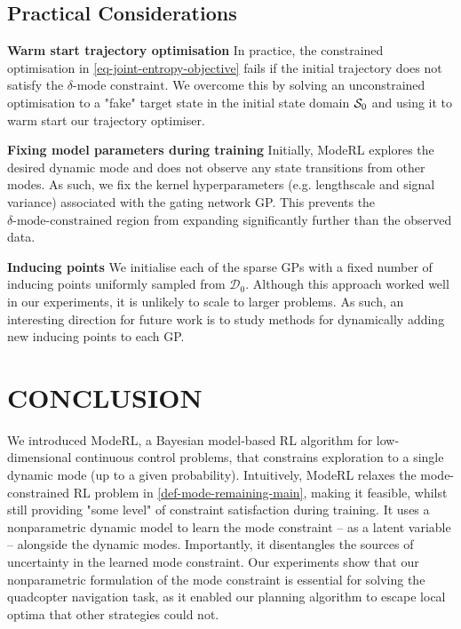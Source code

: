\documentclass[twoside]{article}
\newcommand{\dataset}{\ensuremath{\mathcal{D}}}
\begin{document}
\subsection{Practical Considerations}
\label{sec:org625c4ee}

\textbf{Warm start trajectory optimisation}
In practice, the constrained optimisation in \cref{eq-joint-entropy-objective} fails if the initial trajectory does not satisfy the \(\delta\text{-mode constraint}\).
We overcome this by solving an unconstrained optimisation to a "fake" target state in the initial
state domain \(\mathcal{S}_{0}\) and using it to warm start our trajectory optimiser.

\textbf{Fixing model parameters during training}
Initially, ModeRL explores the desired dynamic mode and does not observe any state transitions from other modes.
As such, we fix the kernel hyperparameters (e.g. lengthscale and signal variance) associated with the gating network GP.
This prevents the \(\delta\text{-mode-constrained}\) region from expanding significantly further than the observed data.

\textbf{Inducing points}
We initialise each of the sparse GPs with a fixed number of inducing points uniformly sampled from \(\dataset_{0}\).
Although this approach worked well in our experiments, it is unlikely to scale to larger problems.
As such, an interesting direction for future work is to study methods for dynamically adding new inducing points to each GP.

\section{CONCLUSION \label{sec-conclusion}}
\label{sec:orgca252bd}
We introduced ModeRL, a Bayesian model-based RL algorithm for low-dimensional continuous control problems,
that constrains exploration to a single dynamic mode (up to a given probability).
Intuitively, ModeRL relaxes the mode-constrained RL problem in \cref{def-mode-remaining-main}, making it feasible,
whilst still providing "some level" of constraint satisfaction during training.
It uses a nonparametric dynamic model to learn the mode constraint -- as a latent variable -- alongside the dynamic modes.
Importantly, it disentangles the sources of uncertainty in the learned mode constraint.
Our experiments show that our nonparametric formulation of the mode constraint is essential for solving the quadcopter navigation task,
as it enabled our planning algorithm to escape local optima that other strategies could not.
\end{document}

